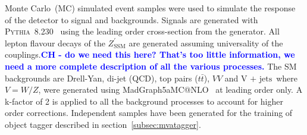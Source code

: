 \documentclass[a4paper,11pt]{article}
\makeatletter
\newcommand{\CH}[1] {\textbf{\textcolor{blue}{CH - #1}}}
\newcommand{\ZpSSM}{\ensuremath{Z^{\prime}_{\mathrm{SSM}}}}
\newcommand*{\vj}{\ensuremath{\text{V + jets}}}
\newcommand*{\ttbar}{\ensuremath{t\bar{t}}}
\newcommand{\amc}{{\sc MadGraph5\textunderscore}a{\sc MC@NLO}}
\makeatother
\begin{document}
Monte Carlo~(MC) simulated event samples were used to simulate the response of the detector to signal and backgrounds. Signals are generated with {\scshape Pythia}~8.230~\cite{Sjostrand:2014zea} using the leading order cross-section from the generator.
All lepton flavour decays of the $\ZpSSM$ are generated assuming universality of the couplings.\CH{do we need this here? That's too little information, we need a more complete description of all the various processes.}
The SM backgrounds are Drell-Yan, di-jet (QCD), top pairs (\ttbar), $VV$ and \vj\ where $V=W/Z$,  were generated using \amc~\cite{Alwall:2014hca} at leading order only. A k-factor of 2 is applied to all the background processes to account for higher order corrections.
Independent samples have been generated for the training of object tagger described in section~\ref{subsec:mvatagger}.


\end{document}
